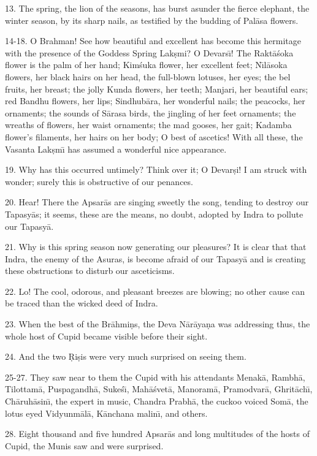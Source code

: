13. The spring, the lion of the seasons, has burst asunder the fierce elephant, the winter season, by its sharp nails, as testified by the budding of Pal\=asa flowers.

14-18. O Brahman! See how beautiful and excellent has become this hermitage with the presence of the Goddess Spring Lak\d{s}mi? O Devars\={\i}! The Rakt\=a\'soka flower is the palm of her hand; Kim\'suka flower, her excellent feet; N\={\i}l\=asoka flowers, her black hairs on her head, the full-blown lotuses, her eyes; the bel fruits, her breast; the jolly Kunda flowers, her teeth; Manjari, her beautiful ears; red Bandhu flowers, her lips; Sindhub\=ara, her wonderful nails; the peacocks, her ornaments; the sounds of S\=arasa birds, the jingling of her feet ornaments; the wreaths of flowers, her waist ornaments; the mad gooses, her gait; Kadamba flower's filaments, her hairs on her body; O best of ascetics! With all these, the Vasanta Lak\d{s}m\={\i} has assumed a wonderful nice appearance.

19. Why has this occurred untimely? Think over it; O Devar\d{s}i! I am struck with wonder; surely this is obstructive of our penances.

20. Hear! There the Apsar\=as are singing sweetly the song, tending to destroy our Tapasy\=as; it seems, these are the means, no doubt, adopted by Indra to pollute our Tapasy\=a.

21. Why is this spring season now generating our pleasures? It is clear that that Indra, the enemy of the Asuras, is become afraid of our Tapasy\=a and is creating these obstructions to disturb our asceticisms.

22. Lo! The cool, odorous, and pleasant breezes are blowing; no other cause can be traced than the wicked deed of Indra.

23. When the best of the Br\=ahmi\d{n}s, the Deva N\=ar\=aya\d{n}a was addressing thus, the whole host of Cupid became visible before their sight.

24. And the two \d{R}i\d{s}is were very much surprised on seeing them.

25-27. They saw near to them the Cupid with his attendants Menak\=a, Rambh\=a, Tilottam\=a, Puspagandh\=a, Suke\'s\={\i}, Mah\=a\'svet\=a, Manoram\=a, Pramodvar\=a, Ghrit\=ach\={\i}, Ch\=aruh\=asin\={\i}, the expert in music, Chandra Prabh\=a, the cuckoo voiced Som\=a, the lotus eyed Vidyunm\=al\=a, K\=anchana malin\={\i}, and others.

28. Eight thousand and five hundred Apsar\=as and long multitudes of the hosts of Cupid, the Munis saw and were surprised.

